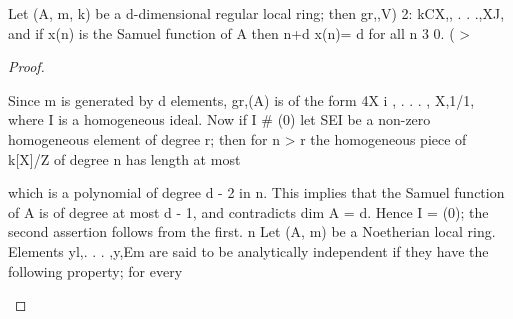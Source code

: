 \begin{theorem}[Theorem 14.4]\label{mcrt-auto-theorem-14-4}\uses{}
\begin{mathematicalrecord}
Let (A, m, k) be a d-dimensional       regular local ring; then
          gr,,V) 2: kCX,, . . .,XJ,
and if x(n) is the Samuel function of A then
                   n+d
          x(n)=      d          for all n 3 0.
                     (     >
\end{mathematicalrecord}
\end{theorem}
\begin{proof}
\begin{mathematicalrecord}
Since m is generated by d elements, gr,(A) is of the form
4X i , . . . , X,1/1, where I is a homogeneous ideal. Now if I # (0) let SEI be a
non-zero homogeneous element of degree r; then for n > r the homogeneous
piece of k[X]/Z       of degree n has length         at most

                     which is a polynomial       of degree d - 2 in n. This
implies that the Samuel function of A is of degree at most d - 1, and
contradicts dim A = d. Hence I = (0); the second assertion follows from
the first. n
   Let (A, m) be a Noetherian local ring. Elements yl,. . . ,y,Em are said to be
analytically independent if they have the following property; for every
\end{mathematicalrecord}
\end{proof}


